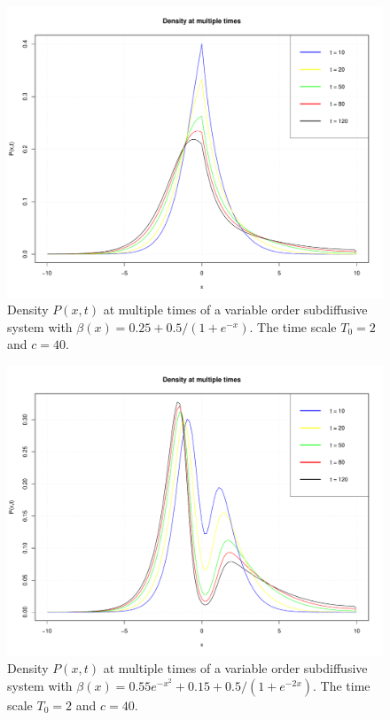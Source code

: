 \documentclass[a4paper,12pt]{elsarticle}
\numberwithin{equation}{section}
\theoremstyle{plain}
\theoremstyle{definition}
\theoremstyle{remark}
\numberwithin{equation}{section}
\newcommand{\1}{\mathbf 1}
\begin{document}
\begin{figure}[h]
\includegraphics[scale=0.6]{varyexp1}
\caption{\label{fig:varyexp1}
Density $P(x,t)$ at multiple times of a variable order subdiffusive system with $\beta(x) = 0.25 + 0.5/(1+e^{-x})$. The time scale $T_0 = 2$ and $c = 40$.}
\end{figure}

\begin{figure}[h]
\includegraphics[scale=0.6]{varyexp2}
\caption{\label{fig:varyexp2}
Density $P(x,t)$ at multiple times of a variable order subdiffusive system with $\beta (x) = 0.55e^{-x^2} + 0.15 + 0.5/(1+e^{-2x})$. The time scale $T_0 = 2$ and $c = 40$.}
\end{figure}
\end{document}
